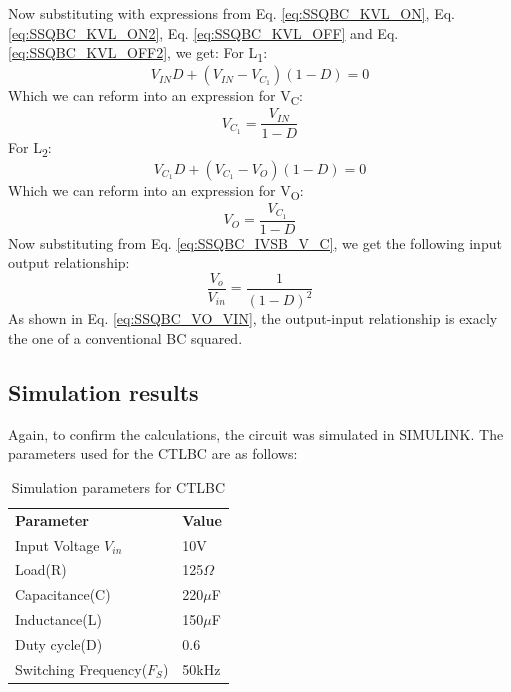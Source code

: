 Now substituting with expressions from Eq. \ref{eq:SSQBC_KVL_ON}, Eq. \ref{eq:SSQBC_KVL_ON2}, Eq. \ref{eq:SSQBC_KVL_OFF} and  Eq. \ref{eq:SSQBC_KVL_OFF2}, we get:
For L\textsubscript{1}:
\begin{equation}
	V_{IN}D+(V_{IN}-V_{C_1})(1-D)=0
	\label{eq:SSQBC_IVSB_L1}
\end{equation}
Which we can reform into an expression for V\textsubscript{C}:
\begin{equation}
	V_{C_1}=\frac{V_{IN}}{1-D}
	\label{eq:SSQBC_IVSB_V_C}
\end{equation}
For L\textsubscript{2}:
\begin{equation}
	V_{C_1}D+(V_{C_1}-V_{O})(1-D)=0
	\label{eq:SSQBC_IVSB_L2}
\end{equation}
Which we can reform into an expression for V\textsubscript{O}:
\begin{equation}
	V_{O}=\frac{V_{C_1}}{1-D}
	\label{eq:SSQBC_IVSB_V_O}
\end{equation}
Now substituting from Eq. \ref{eq:SSQBC_IVSB_V_C}, we get the following input output relationship:
\begin{equation}
	\frac{V_o}{V_{in}} = \frac{1}{(1-D)^2}
	\label{eq:SSQBC_VO_VIN}
\end{equation}
As shown in Eq. \ref{eq:SSQBC_VO_VIN}, the output-input relationship is exacly the one of a conventional BC squared. 

\subsection{Simulation results}

Again, to confirm the calculations, the circuit was simulated in SIMULINK. The parameters used for the CTLBC are as follows:

\begin{table}[H]
\begin{center}
\caption {Simulation parameters for CTLBC} \label{tab:SSQBC} 
\begin{tabular}{|l|l|}
\cline{1-2}
\textbf{Parameter} & \textbf{Value}  \\ \cline{1-2}
Input Voltage $V_{in}$          &      10V   \\ \cline{1-2}
Load(R)   & 125$\Omega$           \\ \cline{1-2}
Capacitance(C)          &       220$\mu$F     \\ \cline{1-2}
Inductance(L)          &      150$\mu$F      \\ \cline{1-2}
Duty cycle(D)          &     0.6       \\ \cline{1-2}
Switching Frequency($F_S$)          &      50kHz      \\ \cline{1-2}
\end{tabular}
\end{center}
\end{table}

